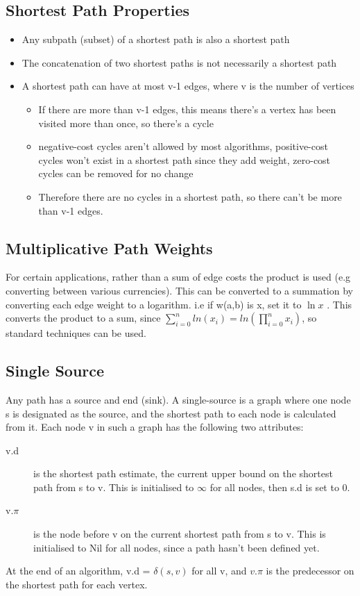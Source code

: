 \subsection{Shortest Path Properties}
\begin{itemize}
    \item Any subpath (subset) of a shortest path is also a shortest path
    \item The concatenation of two shortest paths is not necessarily a shortest path
    \item A shortest path can have at most v-1 edges, where v is the number of vertices
    \begin{itemize}
        \item If there are more than v-1 edges, this means there's a vertex has been visited more than once, so there's a cycle
        \item negative-cost cycles aren't allowed by most algorithms, positive-cost cycles won't exist in a shortest path since they add weight, zero-cost cycles can be removed for no change
        \item Therefore there are no cycles in a shortest path, so there can't be more than v-1 edges.
    \end{itemize}
\end{itemize}

\subsection{Multiplicative Path Weights}
For certain applications, rather than a sum of edge costs the product is used (e.g converting between various currencies). This can be converted to a summation by converting each edge weight to a logarithm. i.e if w(a,b) is x, set it to $\ln{x}$ . This converts the product to a sum, since \(\sum_{i=0}^n ln(x_i) = ln(\prod_{i=0}^n x_i) \), so standard techniques can be used.

\subsection{Single Source}
Any path has a source and end (sink). A single-source is a graph where one node s is designated as the source, and the shortest path to each node is calculated from it. Each node v in such a graph has the following two attributes:
\begin{description}
    \item [v.d] is the shortest path estimate, the current upper bound on the shortest path from s to v.
    This is initialised to $\infty$ for all nodes, then s.d is set to 0.
     \item [v.$\pi$] is the node before v on the current shortest path from s to v. This is initialised to Nil for all nodes, since a path hasn't been defined yet.
\end{description}
At the end of an algorithm, v.d = $\delta(s,v)$ for all v, and $v.\pi$ is the predecessor on the shortest path for each vertex. 

